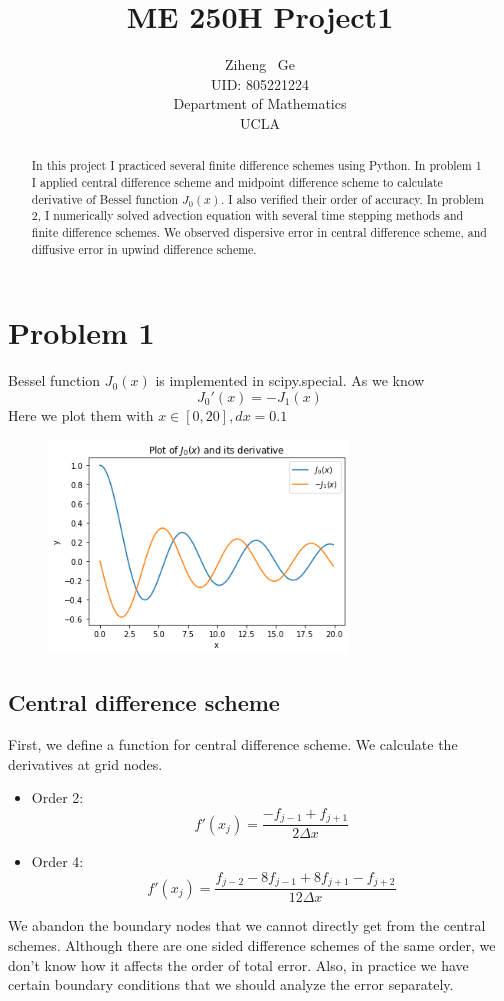 \documentclass{article}
\title{ME 250H Project1}
\author{
  Ziheng ~Ge \\
  UID: 805221224 \\
  Department of Mathematics\\
  UCLA\\
}
\begin{document}
\maketitle

\begin{abstract}
In this project I practiced several finite difference schemes using Python. In problem 1 I applied central difference scheme and midpoint difference scheme to calculate derivative of Bessel function $J_0(x)$. I also verified their order of accuracy. In problem 2, I numerically solved advection equation with several time stepping methods and finite difference schemes. We observed dispersive error in central difference scheme, and diffusive error in upwind difference scheme.
\end{abstract}

\section{Problem 1}
    Bessel function $J_0(x)$ is implemented in scipy.special. As we know
    $$J_0'(x)=-J_1(x)$$
    Here we plot them with $x\in [0,20], dx=0.1$
    \begin{figure}[H]
        \centering
        \includegraphics[width = 8cm]{pictures/pic1.png}
    \end{figure}
\subsection{Central difference scheme}
First, we define a function for central difference scheme. We calculate the derivatives at grid nodes.
\begin{itemize}
    \item Order 2:
    $$f'(x_j)=\frac{-f_{j-1} + f_{j+1}}{2\Delta x}$$
    \item Order 4:
    $$f'(x_j)=\frac{f_{j-2} - 8f_{j-1} + 8f_{j+1} - f_{j+2}}{12\Delta x}$$
\end{itemize}
We abandon the boundary nodes that we cannot directly get from the central schemes. Although there are one sided difference schemes of the same order, we don't know how it affects the order of total error. Also, in practice we have certain boundary conditions that we should analyze the error separately.
\end{document}
